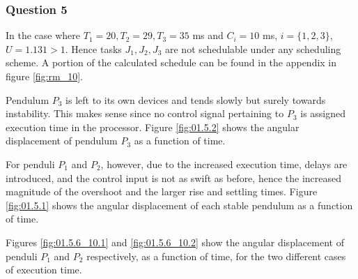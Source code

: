 \subsubsection{Question 5}
In the case where $T_1 = 20, T_2 = 29, T_3 = 35$ ms and $C_i = 10$ ms,
$i=\{1,2,3\}$, $U=1.131 > 1$. Hence tasks $J_1, J_2, J_3$ are not schedulable
under any scheduling scheme. A portion of the calculated schedule can be found in
the appendix in figure \ref{fig:rm_10}.


Pendulum $P_3$ is left to its own devices and tends slowly but surely towards
instability. This makes sense since no control signal pertaining to $P_3$ is
assigned execution time in the processor. Figure \ref{fig:01.5.2} shows the
angular displacement of pendulum $P_3$ as a function of time.

For penduli $P_1$ and $P_2$, however, due to the increased execution time,
delays are introduced, and the control input is not as swift as before,
hence the increased magnitude of the overshoot and the larger rise and settling
times. Figure \ref{fig:01.5.1} shows the angular displacement of each stable
pendulum as a function of time.

Figures \ref{fig:01.5.6_10.1} and \ref{fig:01.5.6_10.2} show the angular
displacement of penduli $P_1$ and $P_2$ respectively, as a function of time, for
the two different cases of execution time.


\noindent{}



